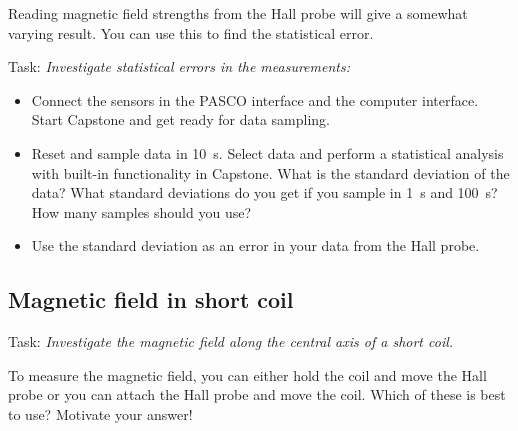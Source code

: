 \documentclass[../Elmag-labhefte-2020.tex]{subfiles}
\begin{document}
Reading magnetic field strengths from the Hall probe will give a somewhat varying result. You can use this to find the statistical error.

Task:
\emph{Investigate statistical errors in the measurements:}
\begin{itemize}
    \item Connect the sensors in the PASCO interface and the computer interface. Start Capstone and get ready for data sampling.
    \item Reset and sample data in \SI{10}{\s}. Select data and perform a statistical analysis with built-in functionality in Capstone. What is the standard deviation of the data? What standard deviations do you get if you sample in \SI{1}{\s} and \SI{100}{\s}? How many samples should you use?
    \item Use the standard deviation as an error in your data from the Hall probe.
\end{itemize}

\subsection{Magnetic field in short coil}

Task:
\emph{Investigate the magnetic field along the central axis of a short coil.}
 

To measure the magnetic field, you can either hold the coil and move the Hall probe or you can attach the Hall probe and move the coil.
Which of these is best to use? Motivate your answer!
\end{document}
